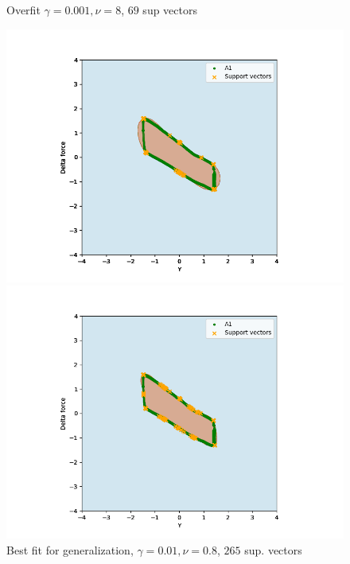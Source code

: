 \begin{figure}[]
\begin{minipage}[b]{0.5\linewidth}
                    \caption*{Overfit $\gamma = 0.001, \nu = 8$, $69$ sup vectors}
                \end{minipage}
                \hfill
                \begin{minipage}[b]{0.5\linewidth}
                    \centering
                    \includegraphics[width = \textwidth]{figures/analysis/oneclass_servo/A1_nu_01_gamma_08.png}
                    \caption*{Best fit for generalization, $\gamma = 0.01, \nu = 0.8$, $265$ sup. vectors}
                \end{minipage}
                \hfill
                \begin{minipage}[b]{0.5\linewidth}
                    \centering
                    \includegraphics[width = \textwidth]{figures/analysis/oneclass_servo/A1_nu_001_gamma_2.png}

\end{minipage}
\end{figure}

